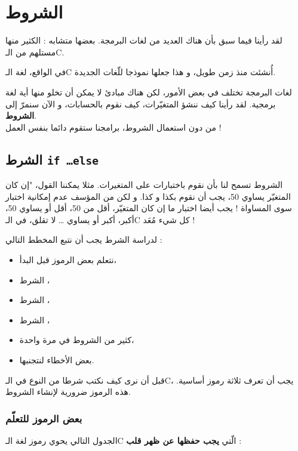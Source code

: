 \chapter{الشروط}

لقد رأينا فيما سبق بأن هناك العديد من لغات البرمجة. بعضها متشابه : الكثير منها مستلهم من الـ\textenglish{C}.

في الواقع، لغة  الـ\textenglish{C}
أُنشئت منذ زمن طويل، و هذا جعلها نموذجا للّغات الجديدة.

لغات البرمجة تختلف في بعض الأمور، لكن هناك مبادئ لا يمكن أن تخلو منها أية لغة برمجية. لقد رأينا كيف ننشؤ المتغيّرات، كيف نقوم بالحسابات، و الآن سنمرّ إلى 
\textbf{الشروط}.\\
من دون استعمال الشروط، برامجنا ستقوم دائما بنفس العمل !

\section{الشرط
\texttt{if \dots else}}

الشروط تسمح لنا بأن نقوم باختبارات على المتغيرات. مثلا يمكننا القول، "إن كان المتغيّر 
يساوي 50، يجب أن نقوم بكذا و كذا. و لكن من المؤسف عدم إمكانية اختبار سوى المساواة ! يجب أيضا اختبار ما إن كان المتغيّر، أقل من 50، أقل أو يساوي 50، أكبر، أكبر أو يساوي
\dots
لا تقلق، في الـ\textenglish{C}
كل شيء مُعَد !

لدراسة الشرط 
يجب أن نتبع المخطط التالي :
\begin{itemize}
\item نتعلم بعض الرموز قبل البدأ،
\item الشرط 
،
\item الشرط 
،
\item الشرط
،
\item كثير من الشروط في مرة واحدة،
\item بعض الأخطاء لنتجنبها.
\end{itemize}

قبل أن نرى كيف نكتب شرطا من النوع
في الـ\textenglish{C}، يجب أن تعرف ثلاثة رموز أساسية. هذه الرموز ضرورية لإنشاء الشروط.

\subsection{بعض الرموز للتعلّم}

الجدول التالي يحوي رموز لغة الـ\textenglish{C} الّتي
\textbf{يجب حفظها عن ظهر قلب} :

